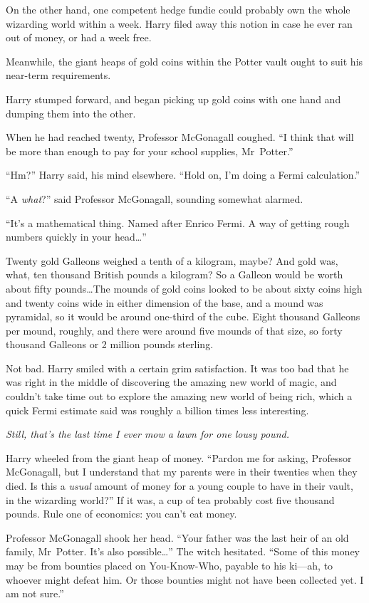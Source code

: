 On the other hand, one competent hedge fundie could probably own the whole wizarding world within a week. Harry filed away this notion in case he ever ran out of money, or had a week free.

Meanwhile, the giant heaps of gold coins within the Potter vault ought to suit his near-term requirements.

Harry stumped forward, and began picking up gold coins with one hand and dumping them into the other.

When he had reached twenty, Professor McGonagall coughed. “I think that will be more than enough to pay for your school supplies, Mr~Potter.”

“Hm?” Harry said, his mind elsewhere. “Hold on, I’m doing a Fermi calculation.”

“A \emph{what}?” said Professor McGonagall, sounding somewhat alarmed.

“It’s a mathematical thing. Named after Enrico Fermi. A way of getting rough numbers quickly in your head…”

Twenty gold Galleons weighed a tenth of a kilogram, maybe? And gold was, what, ten thousand British pounds a kilogram? So a Galleon would be worth about fifty pounds…The mounds of gold coins looked to be about sixty coins high and twenty coins wide in either dimension of the base, and a mound was pyramidal, so it would be around one-third of the cube. Eight thousand Galleons per mound, roughly, and there were around five mounds of that size, so forty thousand Galleons or 2 million pounds sterling.

Not bad. Harry smiled with a certain grim satisfaction. It was too bad that he was right in the middle of discovering the amazing new world of magic, and couldn’t take time out to explore the amazing new world of being rich, which a quick Fermi estimate said was roughly a billion times less interesting.

\emph{Still, that’s the last time I ever mow a lawn for one lousy pound.}

Harry wheeled from the giant heap of money. “Pardon me for asking, Professor McGonagall, but I understand that my parents were in their twenties when they died. Is this a \emph{usual} amount of money for a young couple to have in their vault, in the wizarding world?” If it was, a cup of tea probably cost five thousand pounds. Rule one of economics: you can’t eat money.

Professor McGonagall shook her head. “Your father was the last heir of an old family, Mr~Potter. It’s also possible…” The witch hesitated. “Some of this money may be from bounties placed on You-Know-Who, payable to his ki—ah, to whoever might defeat him. Or those bounties might not have been collected yet. I am not sure.”

